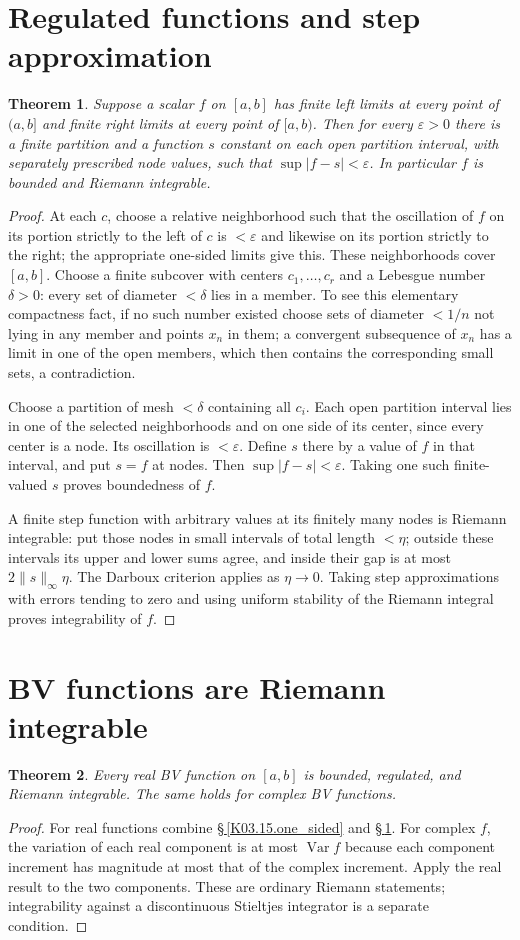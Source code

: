 \documentclass[11pt,oneside,a4paper]{book}
\newtheorem{theorem}{Theorem}[chapter]
\theoremstyle{definition}
\theoremstyle{remark}
\newcommand{\eps}{\varepsilon}
\newcommand{\abs}[1]{\lvert#1\rvert}
\newcommand{\norm}[1]{\lVert#1\rVert}
\DeclareMathOperator{\Var}{Var}
\newcommand{\KEntry}[2]{\Needspace{7\baselineskip}\section{#2}\label{#1}{\small\sffamily\color{black!60}\detokenize{#1}}\par}
\newcommand{\KRef}[1]{\hyperref[#1]{\S\,\ref*{#1}}}
\begin{document}
\KEntry{K03.15.regulated}{Regulated functions and step approximation}
\begin{theorem}
Suppose a scalar $f$ on $[a,b]$ has finite left limits at every point of $(a,b]$ and finite right limits at every point of $[a,b)$. Then for every $\eps>0$ there is a finite partition and a function $s$ constant on each open partition interval, with separately prescribed node values, such that $\sup\abs{f-s}<\eps$. In particular $f$ is bounded and Riemann integrable.
\end{theorem}
\begin{proof}
At each $c$, choose a relative neighborhood such that the oscillation of $f$ on its portion strictly to the left of $c$ is $<\eps$ and likewise on its portion strictly to the right; the appropriate one-sided limits give this. These neighborhoods cover $[a,b]$. Choose a finite subcover with centers $c_1,\ldots,c_r$ and a Lebesgue number $\delta>0$: every set of diameter $<\delta$ lies in a member. To see this elementary compactness fact, if no such number existed choose sets of diameter $<1/n$ not lying in any member and points $x_n$ in them; a convergent subsequence of $x_n$ has a limit in one of the open members, which then contains the corresponding small sets, a contradiction.

Choose a partition of mesh $<\delta$ containing all $c_i$. Each open partition interval lies in one of the selected neighborhoods and on one side of its center, since every center is a node. Its oscillation is $<\eps$. Define $s$ there by a value of $f$ in that interval, and put $s=f$ at nodes. Then $\sup\abs{f-s}<\eps$. Taking one such finite-valued $s$ proves boundedness of $f$.

A finite step function with arbitrary values at its finitely many nodes is Riemann integrable: put those nodes in small intervals of total length $<\eta$; outside these intervals its upper and lower sums agree, and inside their gap is at most $2\norm{s}_\infty\eta$. The Darboux criterion applies as $\eta\to0$. Taking step approximations with errors tending to zero and using uniform stability of the Riemann integral proves integrability of $f$.
\end{proof}

\KEntry{K03.15.bv_riemann}{BV functions are Riemann integrable}
\begin{theorem}
Every real BV function on $[a,b]$ is bounded, regulated, and Riemann integrable. The same holds for complex BV functions.
\end{theorem}
\begin{proof}
For real functions combine \KRef{K03.15.one_sided} and \KRef{K03.15.regulated}. For complex $f$, the variation of each real component is at most $\Var f$ because each component increment has magnitude at most that of the complex increment. Apply the real result to the two components. These are ordinary Riemann statements; integrability against a discontinuous Stieltjes integrator is a separate condition.
\end{proof}
\end{document}
